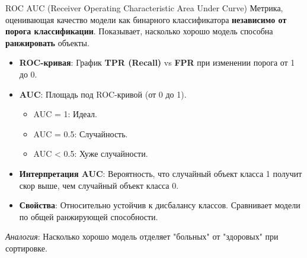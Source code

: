 \begin{myexampleblock}{{ROC AUC (Receiver Operating Characteristic Area Under Curve)}}
    Метрика, оценивающая качество модели как бинарного классификатора \textbf{независимо от порога классификации}. Показывает, насколько хорошо модель способна \textbf{ранжировать} объекты.

    \begin{itemize}[nosep, leftmargin=*]
        \item \textbf{ROC-кривая}: График \textbf{TPR (Recall)} vs \textbf{FPR} при изменении порога от 1 до 0.
        \item \textbf{AUC}: Площадь под ROC-кривой (от 0 до 1).
            \begin{itemize}
                \item AUC = 1: Идеал.
                \item AUC = 0.5: Случайность.
                \item AUC < 0.5: Хуже случайности.
            \end{itemize}
        \item \textbf{Интерпретация AUC}: Вероятность, что случайный объект класса 1 получит скор выше, чем случайный объект класса 0.
        \item \textbf{Свойства}: Относительно устойчив к дисбалансу классов. Сравнивает модели по общей ранжирующей способности.
    \end{itemize}
    \textit{Аналогия}: Насколько хорошо модель отделяет "больных" от "здоровых" при сортировке.

    \begin{center}
    \end{center}
\end{myexampleblock}

